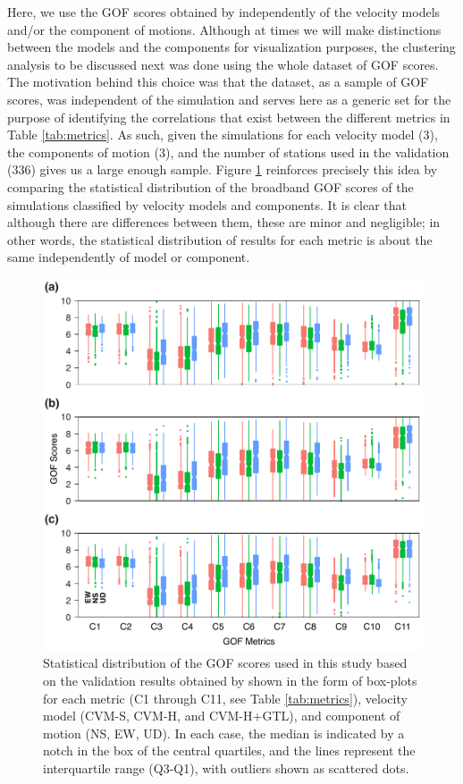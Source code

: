 Here, we use the GOF scores obtained by \citet{Taborda_2014_BSSA} independently of the velocity models and/or the component of motions. Although at times we will make distinctions between the models and the components for visualization purposes, the clustering analysis to be discussed next was done using the whole dataset of GOF scores. The motivation behind this choice was that the dataset, as a sample of GOF scores, was independent of the simulation and serves here as a generic set for the purpose of identifying the correlations that exist between the different metrics in Table \ref{tab:metrics}. As such, given the simulations for each velocity model (3), the components of motion (3), and the number of stations used in the validation (336) gives us a large enough sample. Figure \ref{fig:data-box-plot} reinforces precisely this idea by comparing the statistical distribution of the broadband GOF scores of the simulations classified by velocity models and components. It is clear that although there are differences between them, these are minor and negligible; in other words, the statistical distribution of results for each metric is about the same independently of model or component.

\begin{figure}
    \centering
    \includegraphics[width=\columnwidth]{figures/pdf/figure-03}
    \caption{Statistical distribution of the GOF scores used in this study based on the validation results obtained by \citet{Taborda_2014_BSSA} shown in the form of box-plots for each metric (C1 through C11, see Table \ref{tab:metrics}), velocity model (CVM-S, CVM-H, and CVM-H+GTL), and component of motion (NS, EW, UD). In each case, the median is indicated by a notch in the box of the central quartiles, and the lines represent the interquartile range (Q3-Q1), with outliers shown as scattered dots.}
    \label{fig:data-box-plot}
\end{figure}

